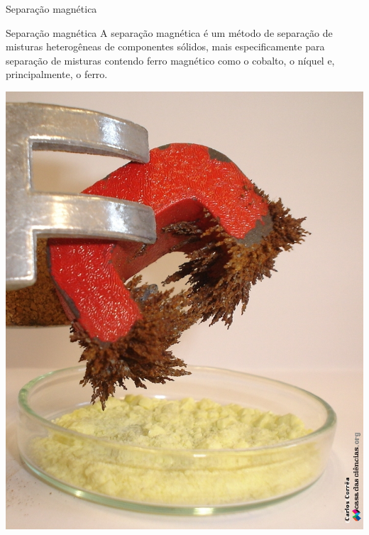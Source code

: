 \documentclass{beamer}
\begin{document}
\begin{frame}[label={sec:orgec54a50}]{Separação magnética}
\begin{block}{Separação magnética}
A separação magnética é um método de separação de misturas heterogêneas de componentes sólidos, mais especificamente para separação de misturas contendo ferro magnético como o cobalto, o níquel e, principalmente, o ferro.

\begin{center}
\includegraphics[scale=0.2]{../img/separacao_magnetica.jpg}
\end{center}
\end{block}
\end{frame}
\end{document}
